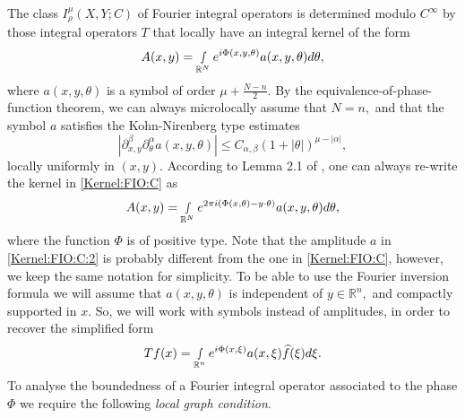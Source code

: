 \documentclass[12pt, reqno]{amsart}
\theoremstyle{definition}
\theoremstyle{remark}
\numberwithin{equation}{section}
\begin{document}
The class  $I^\mu_\rho(X,Y;C)$ of Fourier integral operators is determined modulo $C^{\infty}$ by those integral operators $T$ that locally have an integral  kernel of the form
\begin{align}\label{Kernel:FIO:C}
    A(x,y)=\smallint\limits_{\mathbb{R}^N}e^{i\Phi(x,y,\theta)}a(x,y,\theta)d\theta,
\end{align}where $a(x,y,\theta)$ is a symbol of order $\mu+\frac{N-n}{2}.$ 
By the equivalence-of-phase-function theorem, we can always microlocally assume that $N=n,$ and that the symbol $a$ satisfies the Kohn-Nirenberg type estimates
\begin{equation}
    |\partial_{x,y}^{\beta}\partial_\theta^\alpha a(x,y,\theta)|\leq C_{\alpha,\beta}(1+|\theta|)^{\mu-|\alpha|},
\end{equation}locally uniformly in $(x,y).$  According to Lemma 2.1 of \cite{Melin:Sjostrand1976}, one can always re-write the kernel in \eqref{Kernel:FIO:C} as 
\begin{align}\label{Kernel:FIO:C:2}
    A(x,y)=\smallint\limits_{\mathbb{R}^N}e^{2\pi i(\Phi(x,\theta)-y\cdot\theta )}a(x,y,\theta)d\theta,
\end{align}where the function $\Phi$ is of positive type. Note that the amplitude $a$ in \eqref{Kernel:FIO:C:2} is probably different from the one in \eqref{Kernel:FIO:C}, however, we keep the same notation for simplicity. To be able to use the Fourier inversion formula we will assume that $a(x,y,\theta)$ is independent of $y\in \mathbb{R}^n,$ and compactly supported in $x.$ So, we will work with symbols instead of amplitudes, in order to recover the simplified form
\begin{equation}
    Tf(x)=\smallint\limits_{\mathbb{R}^n}e^{i\Phi(x,\xi)}a(x,\xi)\widehat{f}(\xi)d\xi.
\end{equation} 
To analyse the boundedness of a Fourier integral operator associated to the phase $\Phi$ we require the following {\it local graph condition}.
\end{document}

